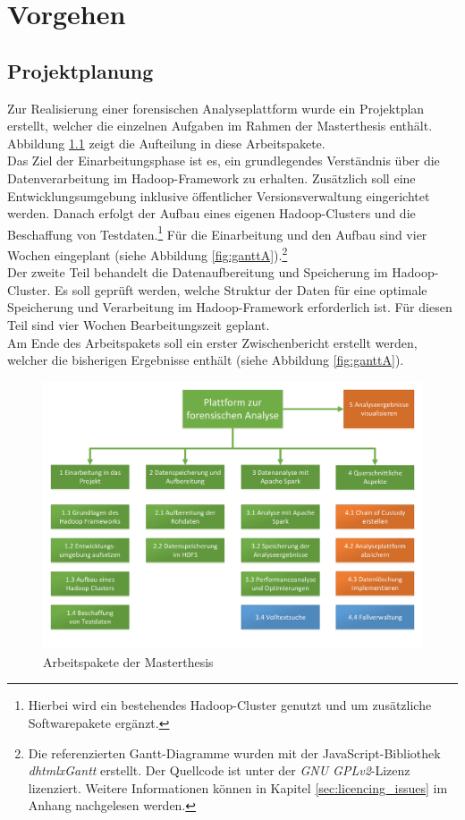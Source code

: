 \chapter{Vorgehen}
\label{ch:development_approach}

\section{Projektplanung}
\label{sec:project_plan}
Zur Realisierung einer forensischen Analyseplattform wurde ein Projektplan erstellt, welcher die einzelnen Aufgaben im Rahmen der Masterthesis enthält. Abbildung \ref{fig:workpackages} zeigt die Aufteilung in diese Arbeitspakete.\\
Das Ziel der Einarbeitungsphase ist es, ein grundlegendes Verständnis über die Datenverarbeitung im Hadoop-Framework zu erhalten. Zusätzlich soll eine Entwicklungsumgebung inklusive öffentlicher Versionsverwaltung eingerichtet werden. Danach erfolgt der Aufbau eines eigenen Hadoop-Clusters und die Beschaffung von Testdaten.\footnote{Hierbei wird ein bestehendes Hadoop-Cluster genutzt und um zusätzliche Softwarepakete ergänzt.} Für die Einarbeitung und den Aufbau sind vier Wochen eingeplant (siehe Abbildung \ref{fig:ganttA}).\footnote{Die referenzierten Gantt-Diagramme wurden mit der JavaScript-Bibliothek \textit{dhtmlxGantt} erstellt. Der Quellcode ist unter der \textit{GNU GPLv2}-Lizenz lizenziert. Weitere Informationen können in Kapitel \ref{sec:licencing_issues} im Anhang nachgelesen werden.}\\

\noindent
Der zweite Teil behandelt die Datenaufbereitung und Speicherung im Hadoop-Cluster. Es soll geprüft werden, welche Struktur der Daten für eine optimale Speicherung und Verarbeitung im Hadoop-Framework erforderlich ist. Für diesen Teil sind vier Wochen Bearbeitungszeit geplant.\\
Am Ende des Arbeitspakets soll ein erster Zwischenbericht erstellt werden, welcher die bisherigen Ergebnisse enthält (siehe Abbildung \ref{fig:ganttA}).\\

\begin{figure}[ht]
  \centering
  \includegraphics[width=\textwidth]{./resource/Arbeitspakete.pdf}
  \caption{Arbeitspakete der Masterthesis}
  \label{fig:workpackages}
\end{figure}

